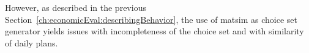 However, as described in the previous Section~\ref{ch:economicEval:describingBehavior}, the use of \acrshort{matsim} as choice set generator yields issues with incompleteness of the choice set and with 
similarity
of daily plans.
%
%
%
%

